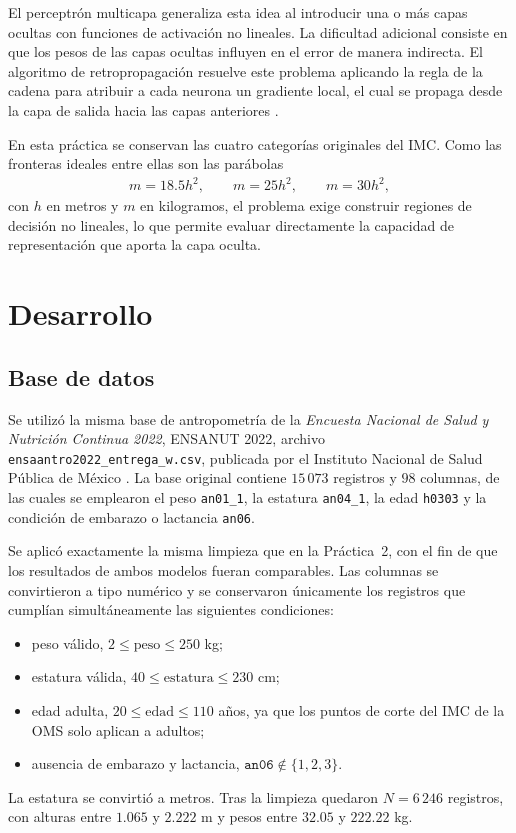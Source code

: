 \documentclass[conference]{IEEEtran}
\begin{document}
El perceptrón multicapa generaliza esta idea al introducir una o más capas
ocultas con funciones de activación no lineales. La dificultad adicional
consiste en que los pesos de las capas ocultas influyen en el error de
manera indirecta. El algoritmo de retropropagación resuelve este problema
aplicando la regla de la cadena para atribuir a cada neurona un gradiente
local, el cual se propaga desde la capa de salida hacia las capas
anteriores \cite{b1,b2,b3,b4,b5}.

En esta práctica se conservan las cuatro categorías originales del IMC. Como
las fronteras ideales entre ellas son las parábolas
\begin{align}
    \label{eq:fronteras}
    m=18.5h^2,\qquad m=25h^2,\qquad m=30h^2,
\end{align}
con $h$ en metros y $m$ en kilogramos, el problema exige construir regiones
de decisión no lineales, lo que permite evaluar directamente la capacidad de
representación que aporta la capa oculta.

\section{Desarrollo}

\subsection{Base de datos}
Se utilizó la misma base de antropometría de la \textit{Encuesta Nacional de
Salud y Nutrición Continua 2022}, ENSANUT 2022, archivo
\texttt{ensaantro2022\_entrega\_w.csv}, publicada por el Instituto Nacional
de Salud Pública de México \cite{b6}. La base original contiene $15\,073$
registros y $98$ columnas, de las cuales se emplearon el peso
\texttt{an01\_1}, la estatura \texttt{an04\_1}, la edad \texttt{h0303} y la
condición de embarazo o lactancia \texttt{an06}.

Se aplicó exactamente la misma limpieza que en la Práctica~2, con el fin de
que los resultados de ambos modelos fueran comparables. Las columnas se
convirtieron a tipo numérico y se conservaron únicamente los registros que
cumplían simultáneamente las siguientes condiciones:
\begin{itemize}
    \item peso válido, $2\leq\text{peso}\leq250$ kg;
    \item estatura válida, $40\leq\text{estatura}\leq230$ cm;
    \item edad adulta, $20\leq\text{edad}\leq110$ años, ya que los puntos de
    corte del IMC de la OMS solo aplican a adultos;
    \item ausencia de embarazo y lactancia, $\texttt{an06}\notin\{1,2,3\}$.
\end{itemize}
La estatura se convirtió a metros. Tras la limpieza quedaron $N=6\,246$
registros, con alturas entre $1.065$ y $2.222$ m y pesos entre $32.05$ y
$222.22$ kg.
\end{document}
